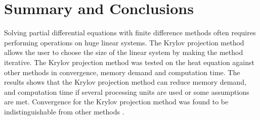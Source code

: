 \section*{Summary and Conclusions}
Solving partial differential equations with finite difference methods often requires performing operations on huge linear systems. The Krylov projection method allows the user to choose the size of the linear system by making the method iterative. The Krylov projection method was tested on the heat equation against other methods in convergence, memory demand and computation time. The results shows that the Krylov projection method can reduce memory demand, and computation time if several processing units are used or some assumptions are met. Convergence for the Krylov projection method was found to be indistinguishable from other methods .

